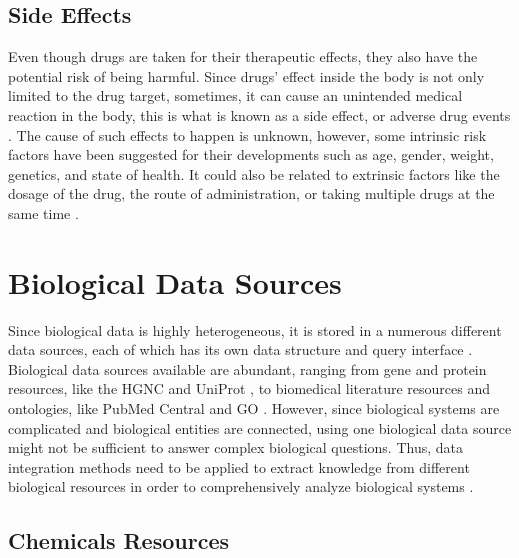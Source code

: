 \subsection{Side Effects}
Even though drugs are taken for their therapeutic effects, they also have the potential risk of being harmful. Since drugs’ effect inside the body is not only limited to the drug target, sometimes, it can cause an unintended medical reaction in the body, this is what is known as a side effect, or adverse drug events \cite{pourpak_understanding_2008}. The cause of such effects to happen is unknown, however, some intrinsic risk factors have been suggested for their developments such as age, gender, weight, genetics, and state of health. It could also be related to extrinsic factors like the dosage of the drug, the route of administration, or taking multiple drugs at the same time \cite{pourpak_understanding_2008}. 

\section{Biological Data Sources}
Since biological data is highly heterogeneous, it is stored in a numerous different data sources, each of which has its own data structure and query interface \cite{baralis_exploring_2008}. Biological data sources available are abundant, ranging from gene and protein resources, like the \ac{HGNC} \cite{baralis_exploring_2008} and UniProt \cite{noauthor_uniprot:_2019}, to biomedical literature resources and ontologies, like PubMed Central \cite{roberts_pubmed_2001} and \ac{GO} \cite{noauthor_gene_2008}. However, since biological systems are complicated and biological entities are connected, using one biological data source might not be sufficient to answer complex biological questions. Thus, data integration methods need to be applied to extract knowledge from different biological resources in order to comprehensively analyze biological systems \cite{baralis_exploring_2008}. 

\subsection{Chemicals Resources}
